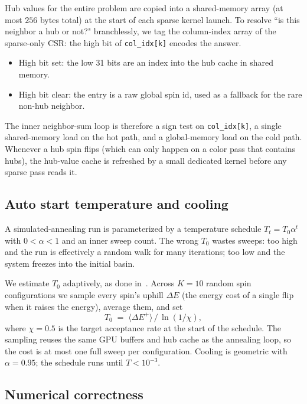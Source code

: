 \documentclass[reprint,twocolumn,amsmath,amssymb,nofootinbib]{revtex4-2}
\newcommand{\dE}{\Delta E}
\begin{document}
Hub values for the entire problem are copied into a shared-memory array (at most $256$ bytes total) at the start of each sparse kernel launch. To resolve ``is this neighbor a hub or not?" branchlessly, we tag the column-index array of the sparse-only CSR: the high bit of \texttt{col\_idx[k]} encodes the answer.
\begin{itemize}
\item High bit set: the low 31 bits are an index into the hub cache in shared memory.
\item High bit clear: the entry is a raw global spin id, used as a fallback for the rare non-hub neighbor.
\end{itemize}
The inner neighbor-sum loop is therefore a sign test on \texttt{col\_idx[k]}, a single shared-memory load on the hot path, and a global-memory load on the cold path. Whenever a hub spin flips (which can only happen on a color pass that contains hubs), the hub-value cache is refreshed by a small dedicated kernel before any sparse pass reads it.

\subsection{Auto start temperature and cooling}\label{sec:sa-temp}

A simulated-annealing run is parameterized by a temperature schedule $T_t = T_0 \alpha^t$ with $0 < \alpha < 1$ and an inner sweep count. The wrong $T_0$ wastes sweeps: too high and the run is effectively a random walk for many iterations; too low and the system freezes into the initial basin.

We estimate $T_0$ adaptively, as done in~\cite{BenAmeur2004}. Across $K = 10$ random spin configurations we sample every spin's uphill $\dE$ (the energy cost of a single flip when it raises the energy), average them, and set
\begin{equation}
  T_0 \;=\; \langle \dE^{+} \rangle \, / \, \ln(1 / \chi),
\end{equation}
where $\chi = 0.5$ is the target acceptance rate at the start of the schedule. The sampling reuses the same GPU buffers and hub cache as the annealing loop, so the cost is at most one full sweep per configuration. Cooling is geometric with $\alpha = 0.95$; the schedule runs until $T < 10^{-3}$.

\subsection{Numerical correctness}\label{sec:sa-scaffolding}
\end{document}
